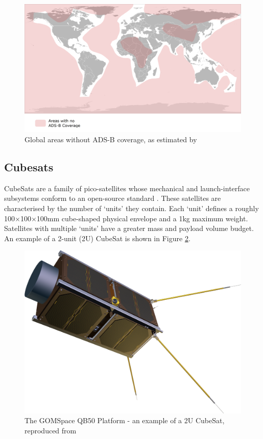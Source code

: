 \begin{figure}[H]
	\centering
	\includegraphics[scale = 0.23]{Pictures/adsb_nocoverage.png}
	
	\caption[Global areas without ADS-B coverage]{Global areas without ADS-B coverage, as estimated by \cite{ADS-B:Aireon_brochure}}
	\label{fig:adsb_nocoverage}
\end{figure}

\newpage
\subsection{Cubesats}
CubeSats are a family of pico-satellites whose mechanical and launch-interface subsystems conform to an open-source standard \cite{Lee2011}. These satellites are characterised by the number of `units' they contain. Each `unit' defines a roughly 100$\times$100$\times$100mm cube-shaped physical envelope and a 1kg maximum weight. Satellites with multiple `units' have a greater mass and payload volume budget. An example of a 2-unit (2U) CubeSat is shown in Figure \ref{fig:2U_example}.

\begin{figure}[H]
	\centering
	\includegraphics[scale = 0.2]{Pictures/QB50-platform.png}
	
	\caption{The GOMSpace QB50 Platform - an example of a 2U CubeSat, reproduced from \cite{GomSpace2013}}
	\label{fig:2U_example}
\end{figure}

